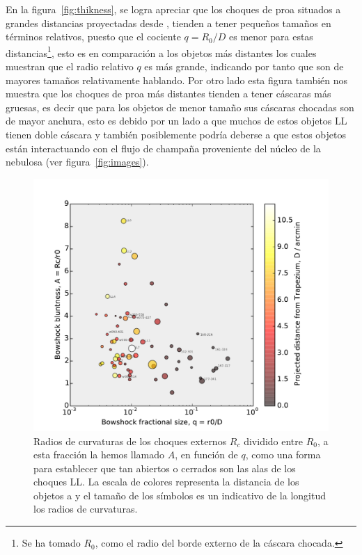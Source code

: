  En la figura~\ref{fig:thikness}, se logra apreciar que los choques de proa situados a grandes distancias  proyectadas desde \thC{}, tienden a tener  pequeños tamaños en términos relativos, puesto que el cociente \(q = R_{0}/D\) es menor para estas distancias\footnote{Se ha tomado \(R_{0}\), como el radio del borde externo de la cáscara chocada.}, esto es en comparación a los objetos más distantes los cuales muestran que el radio relativo \(q\) es más grande, indicando por tanto que son de mayores tamaños relativamente hablando. Por otro lado esta figura también nos muestra que los choques de proa más distantes tienden a tener cáscaras más gruesas, es decir que para los objetos de menor tamaño sus cáscaras chocadas son de mayor anchura, esto es debido por un lado a que muchos de estos objetos LL tienen doble cáscara y también posiblemente podría deberse a que estos objetos están interactuando con el flujo de champaña proveniente del núcleo de la nebulosa (ver figura~\ref{fig:images}).\\ 

\begin{figure}
  \centering
  \includegraphics[width=\linewidth]{luis-programas/will-A-vs-q}
  \caption{Radios de curvaturas de los choques externos \(R_{c}\) dividido entre \(R_{0}\), a esta fracción la hemos llamado \(A\), en función de \(q\), como una forma para establecer que tan abiertos o cerrados son las alas de los choques LL. La escala de colores representa la distancia de los objetos a \thC{} y el tamaño de los símbolos es un indicativo de la longitud los radios de curvaturas.}
  \label{fig:radii-curvatures}
\end{figure} 

